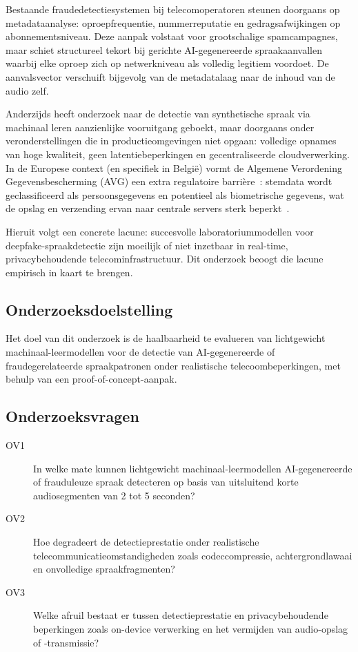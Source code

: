 \documentclass{hogent-article}
\begin{document}
Bestaande fraudedetectiesystemen bij telecomoperatoren steunen doorgaans op
metadataanalyse: oproepfrequentie, nummerreputatie en gedragsafwijkingen op
abonnementsniveau. Deze aanpak volstaat voor grootschalige spamcampagnes, maar
schiet structureel tekort bij gerichte AI-gegenereerde spraakaanvallen waarbij
elke oproep zich op netwerkniveau als volledig legitiem voordoet. De aanvalsvector
verschuift bijgevolg van de metadatalaag naar de inhoud van de audio zelf.

Anderzijds heeft onderzoek naar de detectie van synthetische spraak via machinaal
leren aanzienlijke vooruitgang geboekt, maar doorgaans onder veronderstellingen
die in productieomgevingen niet opgaan: volledige opnames van hoge kwaliteit,
geen latentiebeperkingen en gecentraliseerde cloudverwerking. In de Europese
context (en specifiek in België) vormt de Algemene Verordening
Gegevensbescherming (AVG) een extra regulatoire barrière~\autocite{GDPR2016}:
stemdata wordt geclassificeerd als persoonsgegevens en potentieel als biometrische
gegevens, wat de opslag en verzending ervan naar centrale servers sterk
beperkt~\autocite{Nautsch2019}.

Hieruit volgt een concrete lacune: succesvolle laboratoriummodellen voor
deepfake-spraakdetectie zijn moeilijk of niet inzetbaar in
real-time, privacybehoudende telecominfrastructuur. Dit onderzoek beoogt die
lacune empirisch in kaart te brengen.

\subsection*{Onderzoeksdoelstelling}

Het doel van dit onderzoek is de haalbaarheid te evalueren van lichtgewicht
machinaal-leermodellen voor de detectie van AI-gegenereerde of fraudegerelateerde
spraakpatronen onder realistische telecoombeperkingen, met behulp van een
proof-of-concept-aanpak.

\subsection*{Onderzoeksvragen}

\begin{description}
  \item[OV1] In welke mate kunnen lichtgewicht machinaal-leermodellen
    AI-gegenereerde of frauduleuze spraak detecteren op basis van uitsluitend
    korte audiosegmenten van 2 tot 5 seconden?
  \item[OV2] Hoe degradeert de detectieprestatie onder realistische
    telecommunicatieomstandigheden zoals codeccompressie, achtergrondlawaai en
    onvolledige spraakfragmenten?
  \item[OV3] Welke afruil bestaat er tussen detectieprestatie en
    privacybehoudende beperkingen zoals on-device verwerking en het vermijden van
    audio-opslag of -transmissie?
\end{description}
\end{document}

